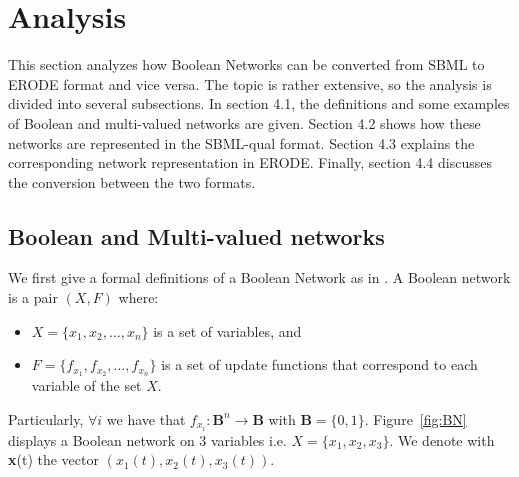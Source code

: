 \chapter{Analysis}
This section analyzes how Boolean Networks can be converted from SBML to ERODE format and vice versa. The topic is rather extensive, so the analysis is divided into several subsections. In section 4.1, the definitions and some examples of Boolean and multi-valued networks are given. Section 4.2 shows how these networks are represented in the SBML-qual format. Section 4.3 explains the corresponding network representation in ERODE. Finally, section 4.4 discusses the conversion between the two formats.


\section{Boolean and Multi-valued networks}

We first give a formal definitions of a Boolean Network as in \cite{argyris2021reducing}. A Boolean network is a pair $(X,F)$ where:
\begin{itemize}
    \item $X=\{x_1, x_2, \ldots ,x_n\}$ is a set of variables, and
    \item $F=\{f_{x_1},f_{x_2}, \ldots, f_{x_n}\}$ is a set of update functions that correspond to each variable of the set $X$.
\end{itemize}

Particularly, $\forall i$ we have that $f_{x_i}:\mathbf{B}^n \to \mathbf{B}$ with $\mathbf{B}=\{0,1\}$.
Figure~\ref{fig:BN} displays a Boolean network on 3 variables i.e. $X=\{x_1,x_2,x_3\}$. We denote with \textbf{x}(t) the vector $(x_1(t),x_2(t),x_3(t))$.

